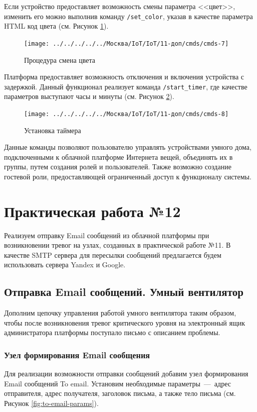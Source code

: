 \documentclass[a4paper,14pt]{extarticle}
\begin{document}
Если устройство предоставляет возможность смены параметра <<цвет>>, изменить его можно выполнив команду \texttt{/set\_color}, указав в качестве параметра HTML код цвета (см. Рисунок \ref{fig:cmds-7}). 

\begin{figure}[h!]
	\centering
	\texttt{[image: ../../../../../Москва/IoT/IoT/11-доп/cmds/cmds-7]}
	\caption{Процедура смена цвета}
	\label{fig:cmds-7}
\end{figure}


Платформа предоставляет возможность отключения и включения устройства с задержкой. Данный функционал реализует команда \texttt{/start\_timer}, где качестве параметров выступают часы и минуты (см. Рисунок \ref{fig:cmds-8}). 
\begin{figure}[h!]
	\centering
	\texttt{[image: ../../../../../Москва/IoT/IoT/11-доп/cmds/cmds-8]}
	\caption{Установка таймера}
	\label{fig:cmds-8}
\end{figure}
\newpage
Данные команды позволяют пользователю управлять устройствами умного дома, подключенными к облачной платформе Интернета вещей, объединять их в группы, путем создания ролей и пользователей. Также возможно создание гостевой роли, предоставляющей ограниченный доступ к функционалу системы.


\section{Практическая работа №12}
Реализуем отправку Email сообщений из облачной платформы при возникновении тревог на узлах, созданных в практической работе №11.
В качестве SMTP сервера для пересылки
сообщений предлагается будем использовать сервера Yandex и Google.

\subsection{Отправка Email сообщений. Умный вентилятор}

Дополним цепочку управления работой умного вентилятора таким образом, чтобы после возникновения тревог критического уровня на электронный ящик администратора платформы поступало письмо с описанием проблемы.
\subsubsection*{Узел формирования Email сообщения}
\label{sec:to-email}
Для реализации возможности отправки сообщений добавим узел формирования Email сообщений To email. Установим необходимые параметры~---~адрес отправителя, адрес получателя, заголовок письма, а также тело письма (см. Рисунок \ref{fig:to-email-params}).
\end{document}

